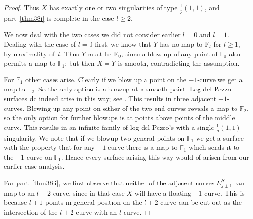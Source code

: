 \documentclass[11pt]{amsbook}
\theoremstyle{plain}
\newcommand{\ldp}{log del Pezzo}
\newcommand{\mb}[1]{\mathbb{#1}}
\newcommand{\F}{\mathrm{F}}
\begin{document}
\begin{proof}
Thus $X$ has exactly one or two singularities of type $\frac{1}p(1,1)$,
and part~\eqref{thm38i} is complete in the case $l\ge2$.


We now deal with the two cases we did not consider earlier $l = 0$ and $l =1$. Dealing with the case of $l = 0$ first, we know that $Y$ has no map to $\F_l$ for $l\ge1$, by maximality of~$l$. Thus $Y$ must be $\F_0$, since a blow up of any point of $\mb{F}_0$ also permits a map to $\mb{F}_1$; but then $X=Y$ is smooth, contradicting the assumption. 

For $\mb{F}_1$ other cases arise. Clearly if we blow up a point on the $-1$-curve we get a map to $\mb{F}_2$. So the only option is a blowup at a smooth point. Log del Pezzo surfaces do indeed arise in this way; see \cite[Table ??]{CP}.
This results in three adjacent $-1$-curves. Blowing up any point on either of the two end curves reveals a map to $\mb{F}_2$, so the only option for further blowups is at points above points of the middle curve.
 This results in an infinite family of \ldp's with a single $\frac{1}{p}(1,1)$ singularity. We note that if we blowup two general points on $\mb{F}_1$ we get a surface with the property that for any $-1$-curve there is a map to $\mb{F}_1$ which sends it to the $-1$-curve on $\mb{F}_1$. Hence every surface arising this way would of arisen from our earlier case analysis.





For part~\eqref{thm38ii}, we first observe that neither of the adjacent curves $E_{j\pm1}^S$ can
map to an $l+2$ curve, since in that case $X$ will have a floating $-1$-curve. This is because $l+1$ points in general position on the $l+2$ curve can be cut out as the intersection of the $l+2$ curve with an $l$ curve.



\end{proof}
\end{document}
